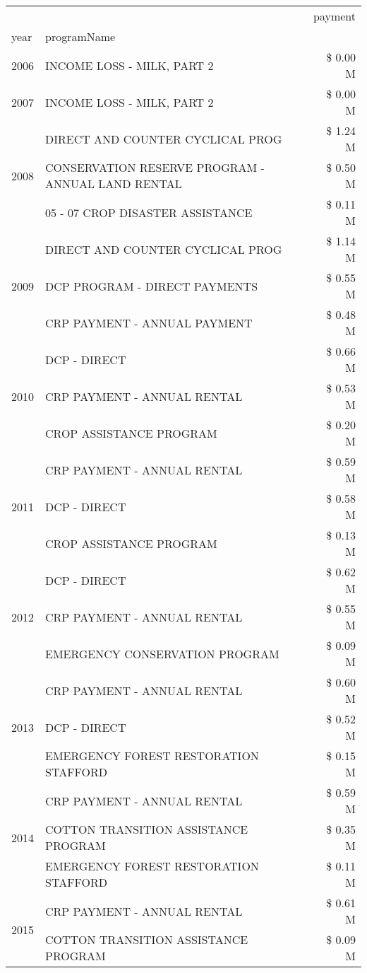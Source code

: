 \begin{tabular}{llr}
\toprule
 &  & payment \\
year & programName &  \\
\midrule
2006 & INCOME LOSS - MILK, PART 2 & \$ 0.00 M \\
\cline{1-3}
2007 & INCOME LOSS - MILK, PART 2 & \$ 0.00 M \\
\cline{1-3}
\multirow[t]{3}{*}{2008} & DIRECT AND COUNTER CYCLICAL PROG & \$ 1.24 M \\
 & CONSERVATION RESERVE PROGRAM - ANNUAL LAND RENTAL & \$ 0.50 M \\
 & 05 - 07 CROP DISASTER ASSISTANCE & \$ 0.11 M \\
\cline{1-3}
\multirow[t]{3}{*}{2009} & DIRECT AND COUNTER CYCLICAL PROG & \$ 1.14 M \\
 & DCP PROGRAM - DIRECT PAYMENTS & \$ 0.55 M \\
 & CRP PAYMENT - ANNUAL PAYMENT & \$ 0.48 M \\
\cline{1-3}
\multirow[t]{3}{*}{2010} & DCP - DIRECT & \$ 0.66 M \\
 & CRP PAYMENT - ANNUAL RENTAL & \$ 0.53 M \\
 & CROP ASSISTANCE PROGRAM & \$ 0.20 M \\
\cline{1-3}
\multirow[t]{3}{*}{2011} & CRP PAYMENT - ANNUAL RENTAL & \$ 0.59 M \\
 & DCP - DIRECT & \$ 0.58 M \\
 & CROP ASSISTANCE PROGRAM & \$ 0.13 M \\
\cline{1-3}
\multirow[t]{3}{*}{2012} & DCP - DIRECT & \$ 0.62 M \\
 & CRP PAYMENT - ANNUAL RENTAL & \$ 0.55 M \\
 & EMERGENCY CONSERVATION PROGRAM & \$ 0.09 M \\
\cline{1-3}
\multirow[t]{3}{*}{2013} & CRP PAYMENT - ANNUAL RENTAL & \$ 0.60 M \\
 & DCP - DIRECT & \$ 0.52 M \\
 & EMERGENCY FOREST RESTORATION STAFFORD & \$ 0.15 M \\
\cline{1-3}
\multirow[t]{3}{*}{2014} & CRP PAYMENT - ANNUAL RENTAL & \$ 0.59 M \\
 & COTTON TRANSITION ASSISTANCE PROGRAM & \$ 0.35 M \\
 & EMERGENCY FOREST RESTORATION STAFFORD & \$ 0.11 M \\
\cline{1-3}
\multirow[t]{3}{*}{2015} & CRP PAYMENT - ANNUAL RENTAL & \$ 0.61 M \\
 & COTTON TRANSITION ASSISTANCE PROGRAM & \$ 0.09 M \\

\end{tabular}
